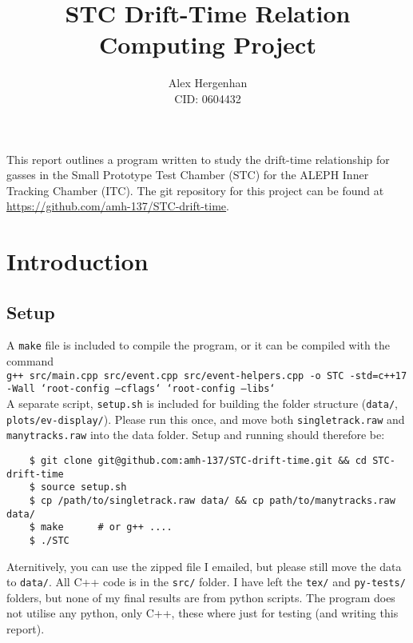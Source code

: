 \documentclass[11pt]{article}
\begin{document}
\title{STC Drift-Time Relation\\\normalsize Computing Project}
\author{Alex Hergenhan\\CID: 0604432}
\maketitle

This report outlines a program written to study the drift-time relationship for gasses in the Small Prototype Test Chamber (STC) for the ALEPH Inner Tracking Chamber (ITC). The git repository for this project can be found at \href{https://github.com/amh-137/STC-drift-time}{https://github.com/amh-137/STC-drift-time}.

\section{Introduction}
\label{sec:intro}

\subsection{Setup}
\label{sec:setup}
A \texttt{make} file is included to compile the program, or it can be compiled with the command\\

\texttt{g++ src/main.cpp src/event.cpp src/event-helpers.cpp -o STC -std=c++17 -Wall `root-config --cflags` `root-config --libs`}\\

A separate script, \texttt{setup.sh} is included for building the folder structure (\texttt{data/}, \texttt{plots/ev-display/}). Please run this once, and move both \texttt{singletrack.raw} and \texttt{manytracks.raw} into the data folder. Setup and running should therefore be:
\begin{verbatim}
    $ git clone git@github.com:amh-137/STC-drift-time.git && cd STC-drift-time
    $ source setup.sh
    $ cp /path/to/singletrack.raw data/ && cp path/to/manytracks.raw data/
    $ make      # or g++ ....
    $ ./STC
\end{verbatim}
Aternitively, you can use the zipped file I emailed, but please still move the data to \texttt{data/}. All C++ code is in the \texttt{src/} folder. I have left the \texttt{tex/} and \texttt{py-tests/} folders, but none of my final results are from python scripts. The program does not utilise any python, only C++, these where just for testing (and writing this report).
\end{document}
